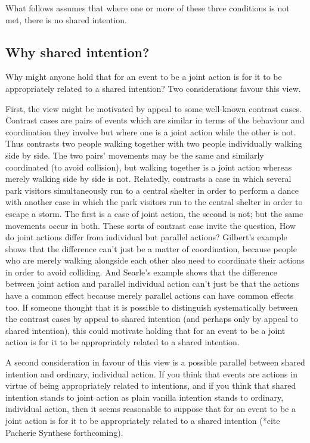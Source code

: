 \documentclass[12pt,\papersize]{extarticle}
\begin{document}
What follows assumes that where one or more of these three conditions is not met, there is no shared intention. 


\subsection{Why shared intention?}
Why might anyone hold that for an event to be a joint action is for it to be appropriately related to a shared intention?
Two considerations favour this view.

First, the view might be motivated by appeal to some well-known contrast cases.
Contrast cases are pairs of events which are similar in terms of the behaviour and coordination they involve but where one is a joint action while the other is not.  
Thus \citet{gilbert_walking_1990} contrasts two people walking together with two people individually walking side by side.  
The two pairs' movements may be the same and similarly coordinated (to avoid collision), but walking together is a joint action whereas merely walking side by side is not. 
Relatedly,  \citet{Searle:1990em}  contrasts a case in which several park visitors simultaneously run to a central shelter in order to perform a dance with another case in which the park visitors run to the central shelter in order to escape a storm.  The first is a case of joint action, the second is not; but the same movements occur in both.  
These sorts of contrast case invite the question, 
How do joint actions differ from individual but parallel actions? 
Gilbert’s example shows that the difference can’t just be a matter of coordination, because people who are merely walking alongside each other also need to coordinate their actions in order to avoid colliding.  
And Searle’s example shows that the difference between joint action and parallel individual action can’t just be that the actions have a common effect because merely parallel actions can have common effects too. 
If someone thought that it is possible to distinguish systematically between the contrast cases by appeal to shared intention (and perhaps only by appeal to shared intention), this could motivate holding that for an event to be a joint action is for it to be appropriately related to a shared intention.

{\label{text:second_consideration} A second consideration} in favour of this view is a possible parallel between shared intention and ordinary, individual action.
If you think that events are actions in virtue of being appropriately related to intentions, 
and if you think that shared intention stands to joint action as plain vanilla intention stands to ordinary, individual action,
then it seems reasonable to suppose that for an event to be a joint action is for it to be appropriately related to a shared intention (*cite Pacherie Synthese forthcoming).
\end{document}
